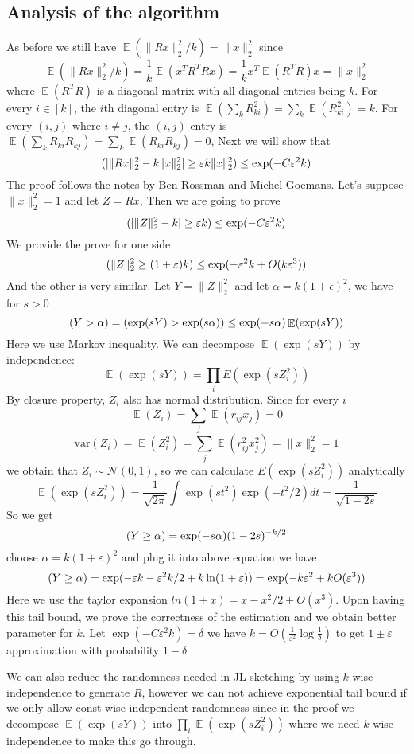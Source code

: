 \documentclass[11pt]{article}
\DeclareMathOperator*{\E}{\mathbb{E}}
\let\Pr\relax
\DeclareMathOperator*{\Pr}{\mathbb{P}}
\newcommand{\eps}{\varepsilon}
\newcommand{\var}{\mathrm{var}}
\begin{document}
\subsection{Analysis of the algorithm}
As before we still have $\E(\|Rx\|_2^2/k) = \|x\|_2^2$ since 
$$ \E(\|Rx\|_2^2/k) = \frac{1}{k}\E(x^TR^TRx) = \frac{1}{k}x^T\E(R^TR)x = \|x\|_2^2 $$
where $\E(R^TR)$ is a diagonal matrix with all diagonal entries being $k$. For every $i \in [k]$, the $i$th diagonal entry is $\E(\sum_k R^2_{ki}) = \sum_k \E(R^2_{ki}) = k$. For every $(i, j)$ where $i \neq j$, the $(i, j)$ entry is $\E(\sum_k R_{ki}R_{kj}) = \sum_k \E(R_{ki}R_{kj}) = 0$, Next we will show that 
$$ \Pr(|\|Rx\|_2^2 - k\|x\|_2^2| \geq \eps k\|x\|_2^2) \leq \exp(-C\eps^2k) $$
The proof follows the notes by Ben Rossman and Michel Goemans. Let's suppose $\|x\|_2^2 = 1$ and let $Z = Rx$, Then we are going to prove
$$ \Pr(|\|Z\|_2^2 - k| \geq \eps k) \leq \exp(-C\eps^2k) $$
We provide the prove for one side
$$ \Pr(\|Z\|_2^2 \geq (1 + \eps) k) \leq \exp(-\eps^2k + O(k\eps^3)) $$
And the other is very similar. Let $Y = \|Z\|_2^2$ and let $\alpha = k(1+ \epsilon)^2$, we have for $s > 0$
$$ \Pr(Y > \alpha) = \Pr(\exp(sY) > \exp(s\alpha)) \leq \exp(-s\alpha)\E(\exp(sY)) $$
Here we use Markov inequality. We can decompose $\E(\exp(sY))$ by independence:
$$ \E(\exp(sY)) = \prod_i E(\exp(sZ_i^2)) $$
By closure property, $Z_i$ also has normal distribution. Since for every $i$
$$\E(Z_i) = \sum_j\E(r_{ij}x_j) = 0$$
$$\var(Z_i) = \E(Z_i^2) = \sum_j \E(r_{ij}^2x_j^2) = \|x\|_2^2 = 1$$
we obtain that $Z_i \sim \mathcal{N}(0, 1)$, so we can calculate $E(\exp(sZ_i^2))$ analytically
$$ \E(\exp(sZ_i^2)) = \frac{1}{\sqrt{2\pi}}\int \exp(st^2)\exp(-t^2/2)dt = \frac{1}{\sqrt{1 - 2s}} $$
So we get
$$ \Pr(Y \geq \alpha) = \exp(-s\alpha)(1 -2s)^{-k/2}$$
choose $\alpha = k(1 + \eps)^2$ and plug it into above equation we have
$$ \Pr(Y \geq \alpha)  = \exp(-\eps k - \eps^2k/2 + k\ln(1 + \eps)) = \exp(-k\eps^2 + kO(\eps^3)) $$
Here we use the taylor expansion $ln(1 + x) = x - x^2/2 + O(x^3)$.
Upon having this tail bound, we prove the correctness of the estimation and we obtain better parameter for $k$. Let $\exp(-C\eps^2k) = \delta$ we have $k = O(\frac{1}{\eps^2}\log\frac{1}{\delta})$ to get $1 \pm \eps$ approximation with probability $1 - \delta$

We can also reduce the randomness needed in JL sketching by using $k$-wise independence to generate $R$, however we can not achieve exponential tail bound if we only allow const-wise independent randomness since in the proof we decompose $\E(\exp(sY))$ into $\prod_i \E(\exp(sZ_i^2))$ where we need $k$-wise independence to make this go through. 
\end{document}
